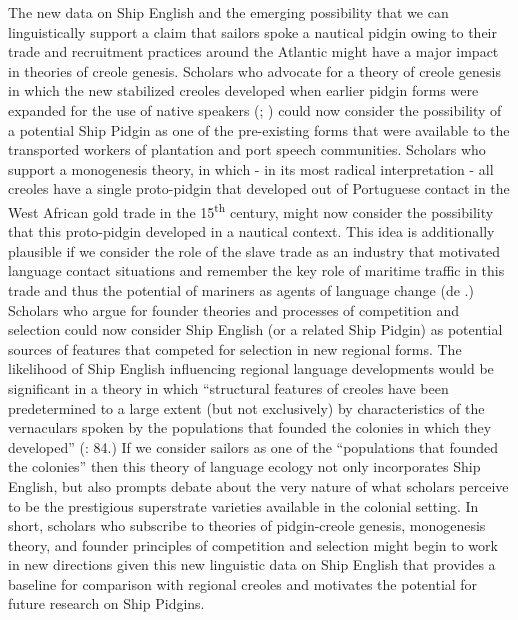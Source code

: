   The new data on Ship English and the emerging possibility that we can linguistically support a claim that sailors spoke a nautical pidgin owing to their trade and recruitment practices around the Atlantic might have a major impact in theories of creole genesis. Scholars who advocate for a theory of creole genesis in which the new stabilized creoles developed when earlier pidgin forms were expanded for the use of native speakers (\citealt{Peyt1986}; \citealt{Holm1988}) could now consider the possibility of a potential Ship Pidgin as one of the pre-existing forms that were available to the transported workers of plantation and port speech communities. Scholars who support a monogenesis theory, in which - in its most radical interpretation - all creoles have a single proto-pidgin that developed out of Portuguese contact in the West African gold trade in the 15\textsuperscript{th} century, might now consider the possibility that this proto-pidgin developed in a nautical context. This idea is additionally plausible if we consider the role of the slave trade as an industry that motivated language contact situations and remember the key role of maritime traffic in this trade and thus the potential of mariners as agents of language change (de \citealt{Granada1976}.) Scholars who argue for founder theories and processes of competition and selection \citep{Mufwene1996} could now consider Ship English (or a related Ship Pidgin) as potential sources of features that competed for selection in new regional forms. The likelihood of Ship English influencing regional language developments would be significant in a theory in which “structural features of creoles have been predetermined to a large extent (but not exclusively) by characteristics of the vernaculars spoken by the populations that founded the colonies in which they developed” (\citealt{Mufwene1996}: 84.) If we consider sailors as one of the “populations that founded the colonies” then this theory of language ecology not only incorporates Ship English, but also prompts debate about the very nature of what scholars perceive to be the prestigious superstrate varieties available in the colonial setting. In short, scholars who subscribe to theories of pidgin-creole genesis, monogenesis theory, and founder principles of competition and selection might begin to work in new directions given this new linguistic data on Ship English that provides a baseline for comparison with regional creoles and motivates the potential for future research on Ship Pidgins. 

